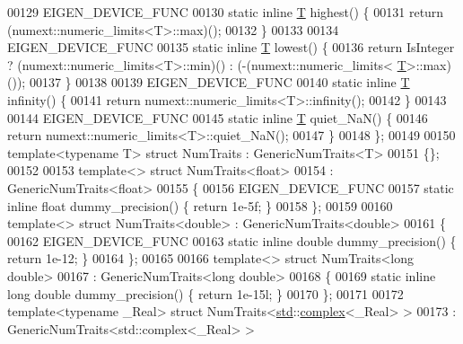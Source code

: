 \begin{DoxyCode}
00129   EIGEN\_DEVICE\_FUNC
00130   \textcolor{keyword}{static} \textcolor{keyword}{inline} \hyperlink{group___sparse_core___module_class_eigen_1_1_triplet}{T} highest() \{
00131     \textcolor{keywordflow}{return} (numext::numeric\_limits<T>::max)();
00132   \}
00133 
00134   EIGEN\_DEVICE\_FUNC
00135   \textcolor{keyword}{static} \textcolor{keyword}{inline} \hyperlink{group___sparse_core___module_class_eigen_1_1_triplet}{T} lowest()  \{
00136     \textcolor{keywordflow}{return} IsInteger ? (numext::numeric\_limits<T>::min)() : (-(numext::numeric\_limits<
      \hyperlink{group___sparse_core___module_class_eigen_1_1_triplet}{T}>::max)());
00137   \}
00138 
00139   EIGEN\_DEVICE\_FUNC
00140   \textcolor{keyword}{static} \textcolor{keyword}{inline} \hyperlink{group___sparse_core___module_class_eigen_1_1_triplet}{T} infinity() \{
00141     \textcolor{keywordflow}{return} numext::numeric\_limits<T>::infinity();
00142   \}
00143 
00144   EIGEN\_DEVICE\_FUNC
00145   \textcolor{keyword}{static} \textcolor{keyword}{inline} \hyperlink{group___sparse_core___module_class_eigen_1_1_triplet}{T} quiet\_NaN() \{
00146     \textcolor{keywordflow}{return} numext::numeric\_limits<T>::quiet\_NaN();
00147   \}
00148 \};
00149 
00150 \textcolor{keyword}{template}<\textcolor{keyword}{typename} T> \textcolor{keyword}{struct }NumTraits : GenericNumTraits<T>
00151 \{\};
00152 
00153 \textcolor{keyword}{template}<> \textcolor{keyword}{struct }NumTraits<float>
00154   : GenericNumTraits<float>
00155 \{
00156   EIGEN\_DEVICE\_FUNC
00157   \textcolor{keyword}{static} \textcolor{keyword}{inline} \textcolor{keywordtype}{float} dummy\_precision() \{ \textcolor{keywordflow}{return} 1e-5f; \}
00158 \};
00159 
00160 \textcolor{keyword}{template}<> \textcolor{keyword}{struct }NumTraits<double> : GenericNumTraits<double>
00161 \{
00162   EIGEN\_DEVICE\_FUNC
00163   \textcolor{keyword}{static} \textcolor{keyword}{inline} \textcolor{keywordtype}{double} dummy\_precision() \{ \textcolor{keywordflow}{return} 1e-12; \}
00164 \};
00165 
00166 \textcolor{keyword}{template}<> \textcolor{keyword}{struct }NumTraits<long double>
00167   : GenericNumTraits<long double>
00168 \{
00169   \textcolor{keyword}{static} \textcolor{keyword}{inline} \textcolor{keywordtype}{long} \textcolor{keywordtype}{double} dummy\_precision() \{ \textcolor{keywordflow}{return} 1e-15l; \}
00170 \};
00171 
00172 \textcolor{keyword}{template}<\textcolor{keyword}{typename} \_Real> \textcolor{keyword}{struct }NumTraits<\hyperlink{namespacestd}{std}::\hyperlink{structcomplex}{complex}<\_Real> >
00173   : GenericNumTraits<std::complex<\_Real> >

\end{DoxyCode}
